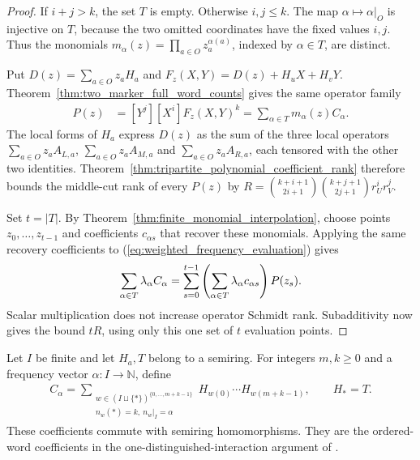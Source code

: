\begin{proof}
    \leanok
    If $i+j>k$, the set $T$ is empty. Otherwise $i,j\le k$.
    The map $\alpha\mapsto\alpha|_O$ is injective on $T$, because the
    two omitted coordinates have the fixed values $i,j$.
    Thus the monomials $m_\alpha(z)=\prod_{a\in O}z_a^{\alpha(a)}$,
    indexed by $\alpha\in T$, are distinct.

    Put $D(z)=\sum_{a\in O}z_aH_a$ and
    $F_z(X,Y)=D(z)+H_uX+H_vY$.
    Theorem~\ref{thm:two_marker_full_word_counts} gives the same operator family
    \begin{align}
        P(z) & =[Y^j][X^i]F_z(X,Y)^k
        =\sum_{\alpha\in T}m_\alpha(z)C_\alpha.
        \label{eq:weighted_frequency_evaluation}
    \end{align}
    The local forms of $H_a$ express $D(z)$ as the sum of the three local
    operators $\sum_{a\in O}z_aA_{L,a}$,
    $\sum_{a\in O}z_aA_{M,a}$ and $\sum_{a\in O}z_aA_{R,a}$,
    each tensored with the other two identities.
    Theorem~\ref{thm:tripartite_polynomial_coefficient_rank} therefore bounds
    the middle-cut rank of every $P(z)$ by
    $R=\binom{k+i+1}{2i+1}\binom{k+j+1}{2j+1}r_U^i r_V^j$.

    Set $t=|T|$. By Theorem~\ref{thm:finite_monomial_interpolation}, choose
    points $z_0,\ldots,z_{t-1}$ and coefficients $c_{\alpha s}$ that recover
    these monomials. Applying the same recovery coefficients to
    (\ref{eq:weighted_frequency_evaluation}) gives
    \begin{align}
        \sum_{\alpha\in T}\lambda_\alpha C_\alpha
        =\sum_{s=0}^{t-1}\left(
        \sum_{\alpha\in T}\lambda_\alpha c_{\alpha s}\right)P(z_s).\notag
    \end{align}
    Scalar multiplication does not increase operator Schmidt rank.
    Subadditivity now gives the bound $tR$, using only this one set of
    $t$ evaluation points.
\end{proof}

\begin{definition}
    \label{def:one_marker_word_coefficient}
    \leanok
    Let $I$ be finite and let $H_a,T$ belong to a semiring. For integers
    $m,k\ge0$ and a frequency vector $\alpha:I\to\mathbb N$, define
    \begin{align*}
        C_\alpha
        =\sum_{\substack{w\in(I\sqcup\{*\})^{\{0,\ldots,m+k-1\}} \\
                n_w(*)=k,\ n_w|_I=\alpha}}
        H_{w(0)}\cdots H_{w(m+k-1)},\qquad H_*=T.
    \end{align*}
    These coefficients commute with semiring homomorphisms.
    They are the ordered-word coefficients in the one-distinguished-interaction
    argument of \cite[Lemma~4.2]{Arad2013AreaLaw}.
\end{definition}

